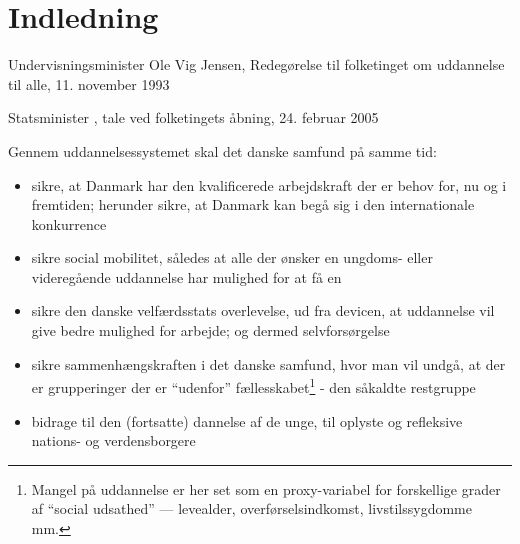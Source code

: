 \section{Indledning}
\label{sec:intro}
\begin{epigraphs}
{Undervisningsminister Ole Vig Jensen, Redegørelse til folketinget om uddannelse til alle, 11. november 1993}

{Statsminister , tale ved folketingets åbning, 24. februar 2005}
\end{epigraphs}


Gennem uddannelsessystemet skal det danske samfund på samme tid:

\begin{itemize}
  \item
    sikre, at Danmark har den kvalificerede arbejdskraft der er behov for, nu og i fremtiden; herunder sikre, at Danmark kan begå sig i den internationale konkurrence
  \item
    sikre social mobilitet, således at alle der ønsker en ungdoms- eller videregående uddannelse har mulighed for at få en
  \item
    sikre den danske velfærdsstats overlevelse, ud fra devicen, at uddannelse vil give bedre mulighed for arbejde; og dermed selvforsørgelse 
  \item
    sikre sammenhængskraften i det danske samfund, hvor man vil undgå, at der er grupperinger der er “udenfor” fællesskabet\footnote{Mangel på uddannelse er her set som en proxy-variabel for forskellige grader af “social udsathed” — levealder, overførselsindkomst, livstilssygdomme mm.} - den såkaldte restgruppe
  \item
    bidrage til den (fortsatte) dannelse af de unge, til oplyste og refleksive nations- og verdensborgere
\end{itemize}

